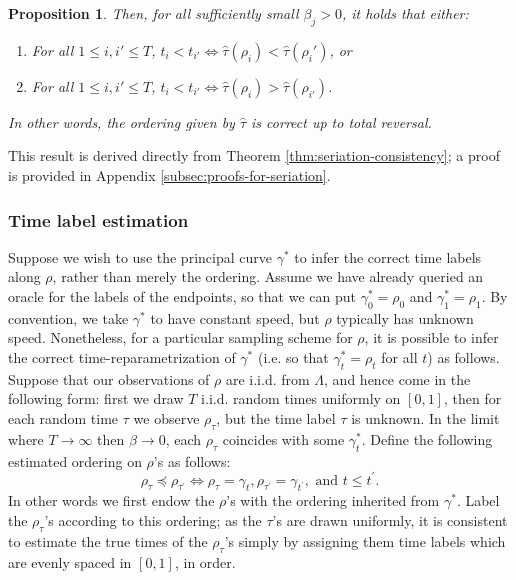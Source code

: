 \documentclass[aos, preprint]{imsart}
\theoremstyle{plain}
\newtheorem{prop}[theorem]{Proposition}
\theoremstyle{remark}
\begin{document}
{\begin{prop}
Then, for all sufficiently small $\beta_j>0$, it holds  that either:
\begin{enumerate}
\item For all  $1\leq i,i'\leq T$, $t_i < t_{i'} \iff \hat{\tau} (\rho_i) < \hat{\tau} (\rho_i')$, or
\item For all  $1\leq i,i'\leq T$, $t_i < t_{i'} \iff \hat{\tau} (\rho_i) > \hat{\tau} (\rho_{i'})$.
\end{enumerate}
In other words, the ordering given by $\hat{\tau}$ is correct up to total reversal.
\end{prop}

This result is derived directly from Theorem
\ref{thm:seriation-consistency}; a
proof is provided in Appendix
\ref{subsec:proofs-for-seriation}.

\subsubsection*{Time label estimation}
Suppose we wish to use the principal curve $\gamma^{*}$ to infer the correct time
labels along $\rho$, rather than merely the ordering. Assume we have already queried an oracle for the
labels of the endpoints, so that we can put $\gamma_{0}^*=\rho_{0}$
and $\gamma_{1}^*=\rho_{1}$. By convention, we take $\gamma^*$ to have
constant speed, but $\rho$ typically has unknown speed. Nonetheless, for a particular
sampling scheme for $\rho$,
it is possible to infer the correct time-reparametrization
of $\gamma^*$
(i.e. so that $\gamma_{t}^*=\rho_{t}$ for all $t$) as
follows.
Suppose that our observations of $\rho$ are i.i.d. from $\Lambda$, and hence come in the following form:
first we draw $T$ i.i.d. random times uniformly on $[0,1]$, then
for each random time $\tau$ we observe $\rho_{\tau}$, but the time
label $\tau$ is unknown. In the limit where $T\rightarrow \infty$ then $\beta\rightarrow 0$, each $\rho_{\tau}$ coincides
with some $\gamma_{t}^*$. Define the following estimated ordering on
$\rho$'s as follows:
\[
\rho_{\tau}\preceq\rho_{\tau^{\prime}}\iff\rho_{\tau}=\gamma_{t},\rho_{\tau^{\prime}}=\gamma_{t^{\prime}},\text{ and }t\leq t^{\prime}.
\]
In other words we first endow the $\rho$'s with the ordering inherited
from $\gamma^*$. Label the $\rho_\tau$'s according to this ordering;
as the $\tau$'s are
drawn uniformly, it is consistent to estimate the true times of the
$\rho_\tau$'s simply by assigning them time labels which are
evenly spaced in $[0,1]$, in order.

}
\end{document}
